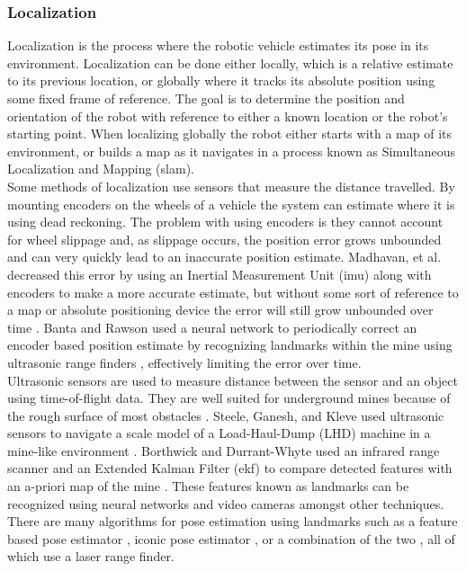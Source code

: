 \subsubsection{Localization}
\label{sec:local}

Localization is the process where the robotic vehicle estimates its pose in its environment. Localization can be done either locally, which is a relative estimate to its previous location, or globally where it tracks its absolute position using some fixed frame of reference. The goal is to determine the position and orientation of the robot with reference to either a known location or the robot's starting point. When localizing globally the robot either starts with a map of its environment, or builds a map as it navigates in a process known as Simultaneous Localization and Mapping (\acrshort{slam}).\\

Some methods of localization use sensors that measure the distance travelled. By mounting encoders on the wheels of a vehicle the system can estimate where it is using dead reckoning. The problem with using encoders is they cannot account for wheel slippage and, as slippage occurs, the position error grows unbounded and can very quickly lead to an inaccurate position estimate. Madhavan, et al. decreased this error by using an Inertial Measurement Unit (\acrshort{imu}) along with encoders to make a more accurate estimate, but without some sort of reference to a map or absolute positioning device the error will still grow unbounded over time \cite{madhavan}. Banta and Rawson used a neural network to periodically correct an encoder based position estimate by recognizing landmarks within the mine using ultrasonic range finders \cite{fusion}, effectively limiting the error over time.\\

Ultrasonic sensors are used to measure distance between the sensor and an object using time-of-flight data. They are well suited for underground mines because of the rough surface of most obstacles \cite{proof}. Steele, Ganesh, and Kleve used ultrasonic sensors to navigate a scale model of a Load-Haul-Dump (LHD) machine in a mine-like environment \cite{ganesh}. Borthwick and Durrant-Whyte used an infrared range scanner and an Extended Kalman Filter (\acrshort{ekf}) to compare detected features with an a-priori map of the mine \cite{borth}. These features known as landmarks can be recognized using neural networks \cite{neural} and video cameras \cite{video} amongst other techniques. There are many algorithms for pose estimation using landmarks such as a feature based pose estimator \cite{feature}, iconic pose estimator \cite{iconic}, or a combination of the two \cite{both}, all of which use a laser range finder.\\

